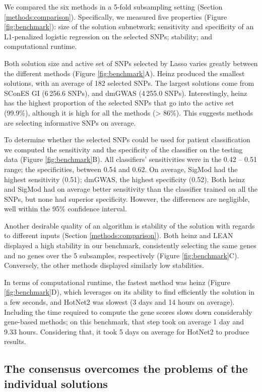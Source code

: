 \documentclass[twocolumn, 10pt]{article}
\begin{document}
We compared the six methods in a 5-fold subsampling setting (Section \ref{methods:comparison}). Specifically, we measured five properties (Figure \ref{fig:benchmark}): size of the solution subnetwork; sensitivity and specificity of an L1-penalized logistic regression on the selected SNPs; stability; and computational runtime.

Both solution size and active set of SNPs selected by Lasso varies greatly between the different methods (Figure \ref{fig:benchmark}A). Heinz produced the smallest solutions, with an average of 182 selected SNPs. The largest solutions come from SConES GI (6\,256.6 SNPs), and dmGWAS (4\,255.0 SNPs). Interestingly, heinz has the highest proportion of the selected SNPs that go into the active set (99.9\%), although it is  high for all the methods (> 86\%). This suggests methods are selecting informative SNPs on average. 

To determine whether the selected SNPs could be used for patient classification we computed the sensitivity and the specificity of the classifier on the testing data (Figure \ref{fig:benchmark}B). All classifiers' sensitivities were in the 0.42 -- 0.51 range; the specificities, between 0.54 and 0.62. On average, SigMod had the highest sensitivity (0.51); dmGWAS, the highest specificity (0.52). Both heinz and SigMod had on average better sensitivity than the classifier trained on all the SNPs, but none had superior specificity. However, the differences are negligible, well within the 95\% confidence interval.   

Another desirable quality of an algorithm is stability of the solution with regards to different inputs (Section \ref{methods:comparison}). Both heinz and LEAN displayed a high stability in our benchmark, consistently selecting the same genes and no genes over the 5 subsamples, respectively (Figure \ref{fig:benchmark}C). Conversely, the other methods displayed similarly low stabilities. 

In terms of computational runtime, the fastest method was heinz (Figure \ref{fig:benchmark}D), which leverages on its ability to find efficiently the solution in a few seconds, and HotNet2 was slowest (3 days and 14 hours on average). Including the time required to compute the gene scores slows down considerably gene-based methods; on this benchmark, that step took on average 1 day and 9.33 hours. Considering that, it took 5 days on average for HotNet2 to produce results. 

\subsection{The consensus overcomes the problems of the individual solutions}
\label{sec:orgc8f05c9}
\end{document}
